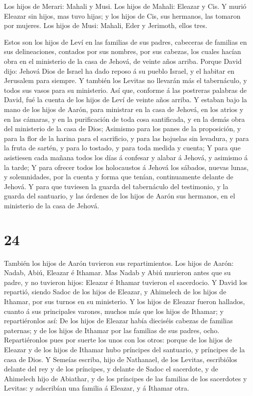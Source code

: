  Los hijos de Merari: Mahali y Musi. Los hijos de Mahali:
Eleazar y Cis.  Y murió Eleazar sin hijos, mas tuvo hijas;
y los hijos de Cis, sus hermanos, las tomaron por mujeres. 
Los hijos de Musi: Mahali, Eder y Jerimoth, ellos tres.

 Estos son los hijos de Leví en las familias de sus padres,
cabeceras de familias en sus delineaciones, contados por sus nombres,
por sus cabezas, los cuales hacían obra en el ministerio de la casa de
Jehová, de veinte años arriba.  Porque David dijo: Jehová
Dios de Israel ha dado reposo á su pueblo Israel, y el habitar en
Jerusalem para siempre.  Y también los Levitas no llevarán
más el tabernáculo, y todos sus vasos para su ministerio. 
Así que, conforme á las postreras palabras de David, fué la cuenta de
los hijos de Leví de veinte años arriba.  Y estaban bajo la
mano de los hijos de Aarón, para ministrar en la casa de Jehová, en los
atrios y en las cámaras, y en la purificación de toda cosa santificada,
y en la demás obra del ministerio de la casa de Dios; 
Asimismo para los panes de la proposición, y para la flor de la harina
para el sacrificio, y para las hojuelas sin levadura, y para la fruta de
sartén, y para lo tostado, y para toda medida y cuenta;  Y
para que asistiesen cada mañana todos los días á confesar y alabar á
Jehová, y asimismo á la tarde;  Y para ofrecer todos los
holocaustos á Jehová los sábados, nuevas lunas, y solemnidades, por la
cuenta y forma que tenían, continuamente delante de Jehová.
 Y para que tuviesen la guarda del tabernáculo del
testimonio, y la guarda del santuario, y las órdenes de los hijos de
Aarón sus hermanos, en el ministerio de la casa de Jehová.

\hypertarget{section-23}{%
\section{24}\label{section-23}}

 También los hijos de Aarón tuvieron sus repartimientos. Los
hijos de Aarón: Nadab, Abiú, Eleazar é Ithamar.  Mas Nadab y
Abiú murieron antes que su padre, y no tuvieron hijos: Eleazar é Ithamar
tuvieron el sacerdocio.  Y David los repartió, siendo Sadoc
de los hijos de Eleazar, y Ahimelech de los hijos de Ithamar, por sus
turnos en su ministerio.  Y los hijos de Eleazar fueron
hallados, cuanto á sus principales varones, muchos más que los hijos de
Ithamar; y repartiéronlos así: De los hijos de Eleazar había dieciséis
cabezas de familias paternas; y de los hijos de Ithamar por las familias
de sus padres, ocho.  Repartiéronlos pues por suerte los
unos con los otros: porque de los hijos de Eleazar y de los hijos de
Ithamar hubo príncipes del santuario, y príncipes de la casa de Dios.
 Y Semeías escriba, hijo de Nathanael, de los Levitas,
escribiólos delante del rey y de los príncipes, y delante de Sadoc el
sacerdote, y de Ahimelech hijo de Abiathar, y de los príncipes de las
familias de los sacerdotes y Levitas: y adscribían una familia á
Eleazar, y á Ithamar otra.

